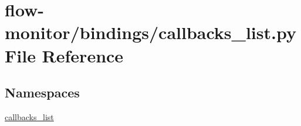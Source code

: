 \hypertarget{flow-monitor_2bindings_2callbacks__list_8py}{}\section{flow-\/monitor/bindings/callbacks\+\_\+list.py File Reference}
\label{flow-monitor_2bindings_2callbacks__list_8py}
\subsection*{Namespaces}
\begin{DoxyCompactItemize}
\item 
 \hyperlink{namespacecallbacks__list}{callbacks\+\_\+list}
\end{DoxyCompactItemize}

